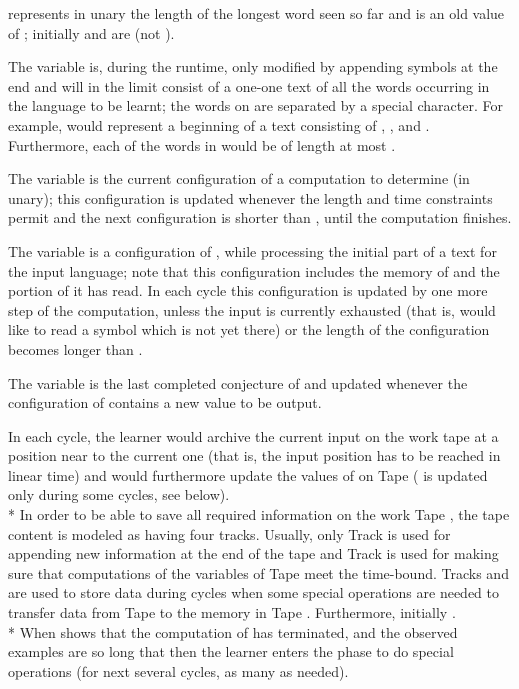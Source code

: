 \documentclass{LMCS}
\theoremstyle{plain}\newtheorem{athm}[thm]{Theorem}
\theoremstyle{plain}\newtheorem{aprop}[thm]{Proposition}
\theoremstyle{plain}\newtheorem{aprob}[thm]{Open Problem}
\theoremstyle{plain}\newtheorem{acor}[thm]{Corollary}
\theoremstyle{plain}\newtheorem{alem}[thm]{Lemma}
\theoremstyle{definition}\newtheorem{adefn}[thm]{Definition}
\theoremstyle{definition}\newtheorem{arem}[thm]{Remark}
\theoremstyle{plain}\newtheorem{aexmp}[thm]{Example}
\theoremstyle{plain}\newtheorem{aclm}[thm]{Claim}
\def\sp{\\*\indent}
\begin{document}
\begin{iteMize}{}
\item  represents in unary the length of the longest word seen so far
and  is an old value of ; initially  and  are  (not ).
\item The variable  is, during the runtime,
only modified by appending symbols at the end and will in the limit
consist of a one-one text of all the words occurring in the language
to be learnt; the words on  are separated by a special character.
For example, 
would represent a beginning of a text consisting of , ,
 and . Furthermore,
each of the words in  would be of length at most .
\item The variable  is the current
configuration of a computation to determine 
(in unary);
this configuration is updated whenever the length and time constraints permit
and the next configuration is shorter than , until the
computation finishes.
\item The variable  is a configuration of , while processing the
initial part  of a text for the input language;
note that this configuration includes the memory of  and the portion
of  it has read.
In each cycle this configuration is updated by one more step of the 
computation,
unless the input  is currently exhausted (that is,  would like
to read a symbol which is not yet there) or the length of the configuration
becomes longer than . 
\item The variable  is the last completed conjecture of
 and updated whenever the configuration  of  contains a new
value to be output.
\end{iteMize}
In each cycle, the learner  would archive the current
input  on the work tape at a position near to the current one (that is, the
input position has to be reached in linear time) and  would furthermore
update the values of  on Tape  ( is
updated only
during some cycles, see below).
\sp
In order to be able to save all required information on the work Tape ,
the tape content is modeled as having four tracks. Usually,
only Track  is used for appending new information at the end of the
tape and Track  is used for making sure that computations of the
variables of Tape  meet the time-bound. 
Tracks  and  are used to store data during cycles when some
special operations are needed to transfer data from Tape  to the memory
 in Tape . Furthermore, initially . 
\sp
When  shows that the computation of
 has terminated, and the observed examples
are so long that  then the learner enters
the phase to do special operations (for next several cycles, as many as needed).
\end{document}
